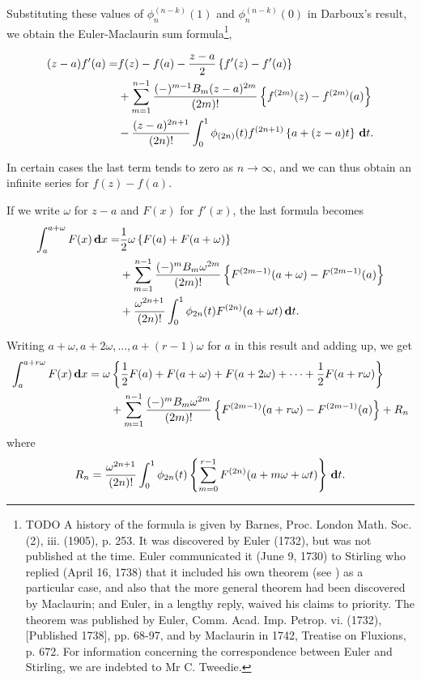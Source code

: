 Substituting these values of $\phi_{n}^{(n-k)}(1)$ and
$\phi_{n}^{(n-k)}(0)$ in Darboux's
result, we obtain the Euler-Maclaurin sum
formula\footnote{TODO A history of the formula is given by Barnes, Proc. London Math. Soc.
(2), iii. (1905), p. 253. It was discovered by Euler (1732), but was
not published at the time. Euler communicated it (June 9, 1730) to
Stirling who replied (April 16, 1738) that it included his own theorem
(see ) as a particular case, and also that the more general
theorem had been discovered by Maclaurin; and Euler, in a lengthy
reply, waived his claims to priority. The theorem was published by
Euler, Comm. Acad. Imp. Petrop. vi. (1732), [Published 1738], pp.
68-97, and by Maclaurin in 1742, Treatise on Fluxions, p. 672. For
information concerning the correspondence between Euler and Stirling,
we are indebted to Mr C. Tweedie.},

%
%
\begin{align*}
(z-a) f'(a)
=&
f(z) - f(a)
- \frac{z-a}{2} \left\{  f'(z) - f'(a)  \right\}
\\
&
+ \sum_{m=1}^{n-1} \frac{ (-)^{m-1} B_{m} (z-a)^{2m}}{(2m)!}
\left\{ f^{(2m)}(z) - f^{(2m)}(a) \right\}
\\
&
-\frac{(z-a)^{2n+1}}{(2n)!}
\int_{0}^{1} \phi_{(2n)}(t) f^{(2n+1)}\left\{  a + (z-a) t  \right\}
\, \mathbf{d} t.
\end{align*}

In certain cases the last term tends to zero as 
$n \rightarrow \infty$, and we can
thus obtain an infinite series for $f(z) - f(a)$.

If we write $\omega$ for $z - a$ and $F(x)$ for $f'(x)$, the last formula becomes
\begin{align*}
  \int_{a}^{a+\omega} F(x) \, \mathbf{d} x
  =
  &
  \frac{1}{2} \omega \left\{  F(a) + F(a + \omega)  \right\}
  \\
  &
  + \sum_{m=1}^{n-1}
  \frac{(-)^{m} B_{m} \omega^{2m}}{(2m)!}
  \left\{ F^{(2m-1)}(a+\omega) - F^{(2m-1)}(a) \right\}
  \\
  &
  + \frac{\omega^{2n+1}}{(2n)!}
  \int_{0}^{1} \phi_{2n}(t) F^{(2n)}(a + \omega t) \, \mathbf{d} t.
\end{align*}

Writing $a + \omega, a + 2\omega, \ldots, a + (r-1) \omega$
for $a$ in this result and adding up, we get
\begin{align*}
\int_{a}^{a + r\omega} F(x) \, \mathbf{d} x
=
\omega
 &
\left\{ 
  \frac{1}{2} F(a) + F(a+\omega) + F(a+2\omega)
  + \cdots + \frac{1}{2} F(a + r\omega)
 \right\}
\\
&
+ \sum_{m=1}^{n-1}
\frac{(-)^{m} B_{m} \omega^{2m}}{(2m)!}
\left\{ 
  F^{(2m-1)}(a + r\omega)
  -
  F^{(2m-1)}(a)
 \right\}
+ R_{n}
\end{align*}
where
$$
R_{n}
=
\frac{\omega^{2n+1}}{(2n)!}
\int_{0}^{1} \phi_{2n}(t)
\left\{  \sum_{m=0}^{r-1} F^{(2n)}(a + m\omega + \omega t) \right\}
\, \mathbf{d} t.
$$

